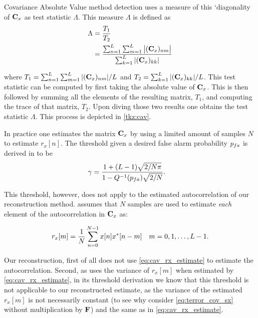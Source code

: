 \documentclass[a4paper, openany, oneside]{memoir}
\begin{document}
Covariance Absolute Value method detection uses a measure of this `diagonality of $\mat{C}_x$ as test statistic $\Lambda$.
This measure $\Lambda$ is defined as
\begin{align}\label{eq:cav_statistic}
\Lambda &= \frac{T_1}{T_2} \nonumber \\
&=\frac{\sum_{n=1}^{L} \sum_{m=1}^L \left|(\mat{C}_x)_{nm}\right|}{\sum_{k=1}^L |(\mat{C}_x)_{kk}|}
\end{align} 

where $T_1 = \sum_{n=1}^{L} \sum_{m=1}^L |(\mat{C}_x)_{nm}|/L$ and
$T_2 = \sum_{k=1}^L |(\mat{C}_x)_{kk}|/L$.
This test statistic can be computed by first taking the absolute value of $\mat{C}_x$. This is then followed by summing all the elements of the resulting matrix, $T_1$, and computing the trace of that matrix, $T_2$. Upon diving those two results one obtains the test statistic $\Lambda$. This process is depicted in \cref{tkz:cav}.

In practice one estimates the matrix $\mat{C}_x$ by using a limited amount of samples $N$ to estimate $r_x[n]$. The threshold given a desired false alarm probability
$p\ss{fa}$ is derived in \cite{zheng2009spectrum} to be
\begin{align*}
\gamma &= \frac{1+(L-1)\sqrt{2/N\pi}}{1-Q^{-1}(p\ss{fa})\sqrt{2/N}}.
\end{align*} 

This threshold, however, does not apply to the estimated autocorrelation of our reconstruction method.  \cite{zheng2009spectrum} assumes that
$N$ samples are used to estimate \emph{each} element of the autocorrelation in $\mat{C}_x$ as:

\begin{align}\label{eq:cav_rx_estimate}
r_x[m] &= \frac{1}{N}\sum_{n=0}^{N-1}x[n]\conj{x}[n-m] & m=0,1,\ldots, L-1.
\end{align}

Our reconstruction, first of all does not use \cref{eq:cav_rx_estimate} to estimate the autocorrelation. Second, as \cite{zheng2009spectrum} uses
the variance of $r_x[m]$ when estimated by \cref{eq:cav_rx_estimate}, in its threshold derivation we know that this threshold is not applicable
to our reconstructed estimate, as the variance of the estimated $r_x[m]$ is not necessarily constant (to see why consider \cref{eq:terror_cov_sx} without multiplication by $\mat{F}$) and the same as in \cref{eq:cav_rx_estimate}.  
\end{document}

